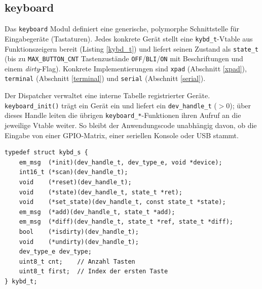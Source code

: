 \subsection{keyboard}\label{keyboard}
Das \verb|keyboard| Modul definiert eine generische, polymorphe
Schnittstelle für Eingabegeräte (\glqq Tastaturen\grqq{}). Jedes konkrete
Gerät stellt eine \verb|kybd_t|-Vtable aus Funktionszeigern bereit
(Listing \ref{kybd_t}) und liefert seinen Zustand als \verb|state_t|
(bis zu \verb|MAX_BUTTON_CNT| Tastenzustände \verb|OFF|/\verb|BLI|/\verb|ON|
mit Beschriftungen und einem \emph{dirty}-Flag). Konkrete Implementierungen
sind \verb|xpad| (Abschnitt \ref{xpad}), \verb|terminal| (Abschnitt
\ref{terminal}) und \verb|serial| (Abschnitt \ref{serial}).

Der Dispatcher verwaltet eine interne Tabelle registrierter Geräte.
\verb|keyboard_init()| trägt ein Gerät ein und liefert ein
\verb|dev_handle_t| ($> 0$); über dieses Handle leiten die übrigen
\verb|keyboard_*|-Funktionen ihren Aufruf an die jeweilige Vtable weiter.
So bleibt der Anwendungscode unabhängig davon, ob die Eingabe von einer
GPIO-Matrix, einer seriellen Konsole oder USB stammt.

\begin{listing}
\begin{verbatim}
typedef struct kybd_s {
    em_msg  (*init)(dev_handle_t, dev_type_e, void *device);
    int16_t (*scan)(dev_handle_t);
    void    (*reset)(dev_handle_t);
    void    (*state)(dev_handle_t, state_t *ret);
    void    (*set_state)(dev_handle_t, const state_t *state);
    em_msg  (*add)(dev_handle_t, state_t *add);
    em_msg  (*diff)(dev_handle_t, state_t *ref, state_t *diff);
    bool    (*isdirty)(dev_handle_t);
    void    (*undirty)(dev_handle_t);
    dev_type_e dev_type;
    uint8_t cnt;    // Anzahl Tasten
    uint8_t first;  // Index der ersten Taste
} kybd_t;
\end{verbatim}
\caption{Geräte-Schnittstelle \texttt{kybd\_t}}
\label{kybd_t}
\end{listing}

